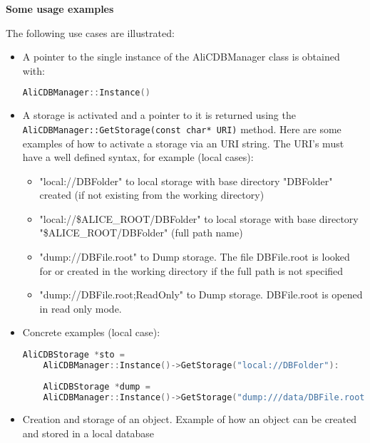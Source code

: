 \documentclass[12pt,a4paper,twoside]{article}
\newcommand{\method}[1]{\texttt{#1}\xspace}
\begin{document}
{\noindent
\textbf{Some usage examples}

The following use cases are illustrated: 

\begin{itemize}
\item A pointer to the single instance of the AliCDBManager class is obtained 
  with:

  \begin{lstlisting}[language=C++]
    AliCDBManager::Instance()
  \end{lstlisting}

\item A storage is activated and a pointer to it is returned using the 
  \method{AliCDBManager::GetStorage(const char* URI)} method. Here are
  some examples of how to activate a storage via an URI string. The
  URI's must have a  well defined syntax, for example (local cases):
  
  \begin{itemize}
  \item "local://DBFolder" to local storage with base directory "DBFolder" 
    created (if not existing from the working directory) 

  \item "local://\$ALICE\_ROOT/DBFolder" to local storage with base directory 
    "\$ALICE\_ROOT/DBFolder" (full path name)

  \item"dump://DBFile.root" to Dump storage. The file DBFile.root is looked 
    for or created in the working directory if the full path is not specified

  \item "dump://DBFile.root;ReadOnly" to Dump storage. DBFile.root is
    opened in   read only mode.
  \end{itemize}

\item Concrete examples (local case):
  
  \begin{lstlisting}[language=C++]
    AliCDBStorage *sto = 
    AliCDBManager::Instance()->GetStorage("local://DBFolder"):
    
    AliCDBStorage *dump = 
    AliCDBManager::Instance()->GetStorage("dump:///data/DBFile.root;ReadOnly"):
  \end{lstlisting}

\item Creation and storage of an object. Example of how an 
  object can be created and stored in a local database


\end{itemize}}
\end{document}
